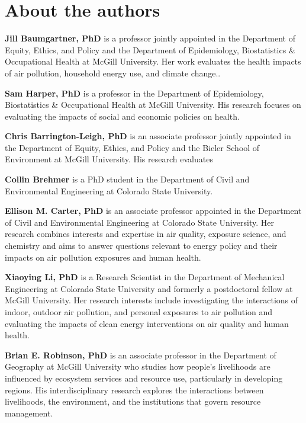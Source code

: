 \documentclass[
  letterpaper,
  DIV=11,
  numbers=noendperiod]{scrartcl}
\begin{document}
\section*{About the authors}\label{about-the-authors}

\textbf{Jill Baumgartner, PhD} is a professor jointly appointed in the
Department of Equity, Ethics, and Policy and the Department of
Epidemiology, Biostatistics \& Occupational Health at McGill University.
Her work evaluates the health impacts of air pollution, household energy
use, and climate change..

\textbf{Sam Harper, PhD} is a professor in the Department of
Epidemiology, Biostatistics \& Occupational Health at McGill University.
His research focuses on evaluating the impacts of social and economic
policies on health.

\textbf{Chris Barrington-Leigh, PhD} is an associate professor jointly
appointed in the Department of Equity, Ethics, and Policy and the Bieler
School of Environment at McGill University. His research evaluates

\textbf{Collin Brehmer} is a PhD student in the Department of Civil and
Environmental Engineering at Colorado State University.

\textbf{Ellison M. Carter, PhD} is an associate professor appointed in
the Department of Civil and Environmental Engineering at Colorado State
University. Her research combines interests and expertise in air
quality, exposure science, and chemistry and aims to answer questions
relevant to energy policy and their impacts on air pollution exposures
and human health.

\textbf{Xiaoying Li, PhD} is a Research Scientist in the Department of
Mechanical Engineering at Colorado State University and formerly a
postdoctoral fellow at McGill University. Her research interests include
investigating the interactions of indoor, outdoor air pollution, and
personal exposures to air pollution and evaluating the impacts of clean
energy interventions on air quality and human health.

\textbf{Brian E. Robinson, PhD} is an associate professor in the
Department of Geography at McGill University who studies how people's
livelihoods are influenced by ecosystem services and resource use,
particularly in developing regions. His interdisciplinary research
explores the interactions between livelihoods, the environment, and the
institutions that govern resource management.
\end{document}
